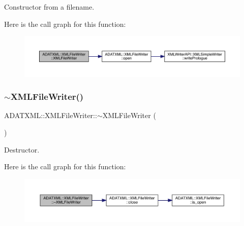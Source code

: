 Constructor from a filename. 

Here is the call graph for this function\+:
\nopagebreak
\begin{figure}[H]
\begin{center}
\leavevmode
\includegraphics[width=350pt]{d6/ddb/classADATXML_1_1XMLFileWriter_a83cf749ff969a30d3de1895f271b238a_cgraph}
\end{center}
\end{figure}
\mbox{\label{classADATXML_1_1XMLFileWriter_af3d1109d92631884682eac46624ca7fd}} 
\subsubsection{\texorpdfstring{$\sim$XMLFileWriter()}{~XMLFileWriter()}\hspace{0.1cm}{\footnotesize\ttfamily [1/3]}}
{\footnotesize\ttfamily A\+D\+A\+T\+X\+M\+L\+::\+X\+M\+L\+File\+Writer\+::$\sim$\+X\+M\+L\+File\+Writer (\begin{DoxyParamCaption}{ }\end{DoxyParamCaption})}



Destructor. 

Here is the call graph for this function\+:\nopagebreak
\begin{figure}[H]
\begin{center}
\leavevmode
\includegraphics[width=350pt]{d6/ddb/classADATXML_1_1XMLFileWriter_af3d1109d92631884682eac46624ca7fd_cgraph}
\end{center}
\end{figure}
\mbox{\label{classADATXML_1_1XMLFileWriter_a40db177b66a4598583a3a08e19c1e927}} 
